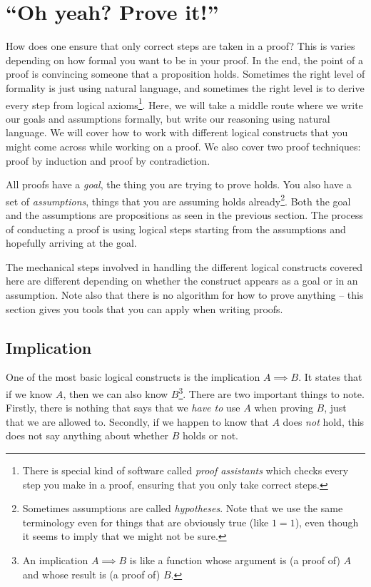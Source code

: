 \documentclass{tufte-handout}
\begin{document}
\section{``Oh yeah? Prove it!''}

How does one ensure that only correct steps are taken in a proof?
This is varies depending on how formal you want to be in your
proof. In the end, the point of a proof is convincing someone that
a proposition holds. Sometimes the right level of formality is
just using natural language, and sometimes the right level is to
derive every step from logical axioms\footnote{There is special
  kind of software called \emph{proof assistants} which checks
  every step you make in a proof, ensuring that you only take
  correct steps.}.
%
Here, we will take a middle route where we write our goals and
assumptions formally, but write our reasoning using natural
language.
%
We will cover how to work with different logical constructs that
you might come across while working on a proof. We also cover two
proof techniques: proof by induction and proof by contradiction.

All proofs have a \emph{goal}, the thing you are trying to prove
holds. You also have a set of \emph{assumptions}, things that you
are assuming holds already\footnote{Sometimes assumptions are
  called \emph{hypotheses}. Note that we use the same terminology
  even for things that are obviously true (like $1=1$), even
  though it seems to imply that we might not be sure.}. Both the
goal and the assumptions are propositions as seen in the previous
section. The process of conducting a proof is using logical steps
starting from the assumptions and hopefully arriving at the goal.

The mechanical steps involved in handling the different logical
constructs covered here are different depending on whether the
construct appears as a goal or in an assumption. Note also that
there is no algorithm for how to prove anything -- this section
gives you tools that you can apply when writing proofs.


\subsection{Implication}

One of the most basic logical constructs is the implication
$A \implies B$. It states that if we know $A$, then we can also
know $B$\footnote{An implication $A \implies B$ is like a function
  whose argument is (a proof of) $A$ and whose result is (a proof
  of) $B$.}. There are two important things to note. Firstly,
there is nothing that says that we \emph{have to} use $A$ when
proving $B$, just that we are allowed to. Secondly, if we happen
to know that $A$ does \emph{not} hold, this does not say anything
about whether $B$ holds or not.
\end{document}

